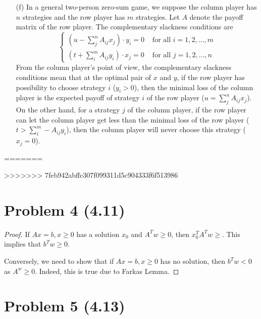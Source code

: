 \documentclass[12pt]{article}
\begin{document}
\begin{itemize}
	\item[(f)] In a general two-person zero-sum game, we suppose the column player has $n$ strategies and the row player has $m$ strategies. Let $A$ denote the payoff matrix of the row player. The complementary slackness conditions are
	\[\begin{cases}
	(u - \sum_{j}^{n} A_{ij}x_{j})\cdot y_i = 0 & \text{ for all } i=1,2,\ldots,m\\
	(t + \sum_{i}^{m} A_{ij}y_{i})\cdot x_j = 0 & \text{ for all } j=1,2,\ldots,n
	\end{cases}\]
	From the column player's point of view, the complementary slackness conditions mean that at the optimal pair of $x$ and $y$, if the row player has possibility to choose strategy $i$ ($y_i>0$), then the minimal loss of the column player is the expected payoff of strategy $i$ of
	the row player ($u = \sum_{j}^{n} A_{ij}x_{j}$). On the other hand, for a strategy $j$ of the column player, if the row player can let the column player get less than the minimal loss of the row player ($t > \sum_{i}^{m} -A_{ij}y_{i}$), then the column player will never choose this strategy ($x_j=0$).
\end{itemize}
=======



>>>>>>> 7feb942abffc307f099311d5c904333f6f513986

\section*{Problem 4 (4.11)}


\begin{proof}

If $Ax = b, x\geqslant 0$ has a solution $x_0$ and $A^Tw \geqslant 0$, then $x_0^TA^Tw \geqslant$. This implies that $b^Tw\geqslant 0$.

Conversely, we need to show that if $Ax = b, x\geqslant 0$ has no solution, then $b^Tw <0$ as $A^w \geqslant 0$. Indeed, this is true due to Farkas Lemma.

\end{proof}

\section*{Problem 5 (4.13)}
\end{document}
